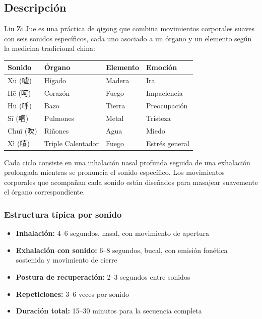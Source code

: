 \documentclass[12pt,a4paper]{article}
\begin{document}
\subsection{Descripción}

Liu Zi Jue es una práctica de qigong que combina movimientos corporales suaves
con seis sonidos específicos, cada uno asociado a un órgano y un elemento
según la medicina tradicional china:

\begin{center}
\begin{tabular}{llll}
    \toprule
    \textbf{Sonido} & \textbf{Órgano} & \textbf{Elemento} & \textbf{Emoción} \\
    \midrule
    Xū (嘘) & Hígado & Madera & Ira \\
    Hē (呵) & Corazón & Fuego & Impaciencia \\
    Hū (呼) & Bazo & Tierra & Preocupación \\
    Sī (呬) & Pulmones & Metal & Tristeza \\
    Chuī (吹) & Riñones & Agua & Miedo \\
    Xì (嘻) & Triple Calentador & Fuego & Estrés general \\
    \bottomrule
\end{tabular}
\end{center}

Cada ciclo consiste en una inhalación nasal profunda seguida de una exhalación
prolongada mientras se pronuncia el sonido específico. Los movimientos
corporales que acompañan cada sonido están diseñados para masajear
suavemente el órgano correspondiente.

\subsubsection{Estructura típica por sonido}

\begin{itemize}
    \item \textbf{Inhalación:} 4--6 segundos, nasal, con movimiento de apertura
    \item \textbf{Exhalación con sonido:} 6--8 segundos, bucal, con emisión
          fonética sostenida y movimiento de cierre
    \item \textbf{Postura de recuperación:} 2--3 segundos entre sonidos
    \item \textbf{Repeticiones:} 3--6 veces por sonido
    \item \textbf{Duración total:} 15--30 minutos para la secuencia completa
\end{itemize}
\end{document}

